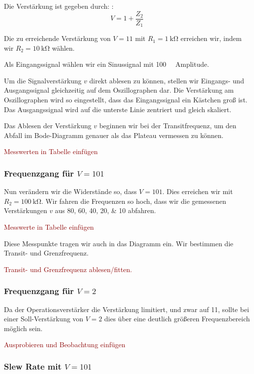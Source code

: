 Die Verstärkung ist gegeben durch: \cite[Formel~5/6.6]{physik313-Anleitung}:
\[
	V = 1 + \frac{Z_2}{Z_1}
\]

Die zu erreichende Verstärkung von $V = 11$ mit $R_1 = \SI{1}{\kilo\ohm}$
erreichen wir, indem wir $R_2 = \SI{10}{\kilo\ohm}$ wählen.

Als Eingangssignal wählen wir ein Sinussignal mit \SI{100}{\milli\voltss}
Amplitude.

Um die Signalverstärkung $v$ direkt ablesen zu können, stellen wir Eingangs-
und Ausgangssignal gleichzeitig auf dem Oszillographen dar. Die Verstärkung am
Oszillographen wird so eingestellt, dass das Eingangssignal ein Kästchen groß
ist. Das Ausgangssignal wird auf die unterste Linie zentriert und gleich
skaliert.

Das Ablesen der Verstärkung $v$ beginnen wir bei der Transitfrequenz, um den
Abfall im Bode-Diagramm genauer als das Plateau vermessen zu können.

\textcolor{darkred}{Messwerten in Tabelle einfügen}

\subsubsection{Frequenzgang für $V = 101$}

Nun verändern wir die Widerstände so, dass $V = 101$. Dies erreichen wir mit
$R_2 = \SI{100}{\kilo\ohm}$. Wir fahren die Frequenzen so hoch, dass wir die
gemessenen Verstärkungen $v$ aus \numlist{80;60;40;20;10} abfahren.

\textcolor{darkred}{Messwerte in Tabelle einfügen}

Diese Messpunkte tragen wir auch in das Diagramm ein. Wir bestimmen die
Transit- und Grenzfrequenz.

\textcolor{darkred}{Transit- und Grenzfrequenz ablesen/fitten.}

\subsubsection{Frequenzgang für $V = 2$}

Da der Operationsverstärker die Verstärkung limitiert, und zwar auf 11, sollte
bei einer Soll-Verstärkung von $V = 2$ dies über eine deutlich größeren
Frequenzbereich möglich sein.

\textcolor{darkred}{Ausprobieren und Beobachtung einfügen}

\subsubsection{Slew Rate mit $V = 101$}


